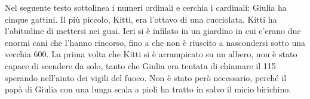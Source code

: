 \item Nel seguente testo sottolinea i numeri ordinali e cerchia i cardinali: Giulia ha cinque gattini. Il più piccolo, Kitti, era l'ottavo di una cucciolata. Kitti ha l'abitudine di mettersi nei guai. Ieri si è infilato in un giardino in cui c'erano due enormi cani che l'hanno rincorso, fino a che non è riuscito a nascondersi sotto una vecchia 600. La prima volta che Kitti si è arrampicato su un albero, non è stato capace di scendere da solo, tanto che Giulia era tentata di chiamare il 115 sperando nell'aiuto dei vigili del fuoco. Non è stato però necessario, perché il papà di Giulia con una lunga scala a pioli ha tratto in salvo il micio birichino. 